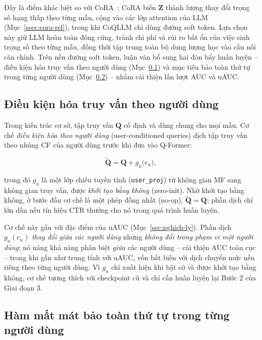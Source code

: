 Đây là điểm khác biệt so với CoRA~\cite{cora2024}: CoRA biến $\mathbf{Z}$ thành lượng thay
đổi trọng số hạng thấp theo từng mẫu, cộng vào các lớp attention của LLM
(Mục~\ref{ssec:cora-rel}), trong khi CoQLLM chỉ dùng đường soft token. Lựa chọn này giữ
LLM hoàn toàn đông cứng, tránh chi phí và rủi ro bất ổn của việc sinh trọng số theo từng
mẫu, đồng thời tập trung toàn bộ dung lượng học vào cầu nối căn chỉnh. Trên nền đường soft
token, luận văn bổ sung hai đòn bẩy huấn luyện -- điều kiện hóa truy vấn theo người dùng
(Mục~\ref{ssec:user-conditioned}) và mục tiêu bảo toàn thứ tự trong từng người dùng
(Mục~\ref{ssec:align-rank}) -- nhằm cải thiện lần lượt AUC và uAUC.

\subsection{Điều kiện hóa truy vấn theo người dùng}
\label{ssec:user-conditioned}

Trong kiến trúc cơ sở, tập truy vấn $\mathbf{Q}$ cố định và dùng chung cho mọi mẫu. Cơ chế
\textit{điều kiện hóa theo người dùng} (user-conditioned queries) dịch tập truy vấn theo
nhúng CF của người dùng trước khi đưa vào Q-Former:

\begin{equation} \label{eq:user-cond}
\tilde{\mathbf{Q}} = \mathbf{Q} + g_u\big( e_u \big),
\end{equation}

trong đó $g_u$ là một lớp chiếu tuyến tính (\texttt{user\_proj}) từ không gian MF sang
không gian truy vấn, được \textit{khởi tạo bằng không} (zero-init). Nhờ khởi tạo bằng
không, ở bước đầu cơ chế là một phép đồng nhất (no-op), $\tilde{\mathbf{Q}} = \mathbf{Q}$;
phần dịch chỉ lớn dần nếu tín hiệu CTR thưởng cho nó trong quá trình huấn luyện.

Cơ chế này gắn với đặc điểm của uAUC (Mục~\ref{sec:nghich-ly}). Phần dịch $g_u(e_u)$
\textit{thay đổi giữa các người dùng} nhưng \textit{không đổi trong phạm vi một người
dùng}: nó nâng khả năng phân biệt \textit{giữa} các người dùng -- cải thiện AUC toàn cục --
trong khi gần như trung tính với uAUC, vốn bất biến với dịch chuyển mức nền riêng theo từng
người dùng. Vì $g_u$ chỉ xuất hiện khi bật cờ và được khởi tạo bằng không, cơ chế tương
thích với checkpoint cũ và chỉ cần huấn luyện lại Bước 2 của Giai đoạn 3.

\subsection{Hàm mất mát bảo toàn thứ tự trong từng người dùng}
\label{ssec:align-rank}

